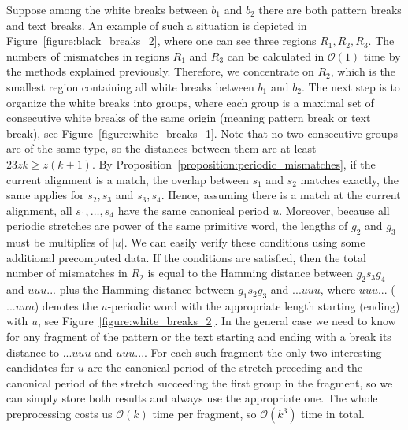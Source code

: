 \documentclass[runningheads]{llncs}
\begin{document}
\begin{mycases}[listparindent=15pt]
\item Suppose among the white breaks between $b_1$ and $b_2$ there are both pattern breaks and text breaks. An example of such a situation is depicted in Figure~\ref{figure:black_breaks_2}, where one can see three regions $R_1,R_2,R_3$.
The numbers of mismatches in regions $R_1$ and $R_3$ can be calculated in $\mathcal{O}(1)$ time by the methods explained previously. Therefore, we concentrate on $R_2$, which is the smallest region containing all white breaks between $b_1$ and $b_2$. The next step is to organize the white breaks into groups, where each group is a maximal set of consecutive white breaks of the same origin (meaning pattern break or text break),
see Figure~\ref{figure:white_breaks_1}.
Note that no two consecutive groups are of the same type, so the distances between them are at least $23zk\geq z(k+1)$. By Proposition~\ref{proposition:periodic_mismatches}, if the current alignment is a match, the overlap between $s_1$ and $s_2$ matches exactly, the same applies for $s_2, s_3$ and $s_3, s_4$. Hence, assuming there is a match at the current alignment, all $s_1, \ldots, s_4$ have the same canonical period $u$. Moreover, because all periodic stretches are power of the same primitive word, the lengths of $g_2$ and $g_3$ must be multiplies of $|u|$.
We can easily verify these conditions using some additional precomputed data. If the conditions are satisfied, then the total number of mismatches in $R_2$ is equal to the Hamming distance between $g_{2}s_{3}g_{4}$ and $uuu...$ plus the Hamming distance between $g_{1}s_{2}g_{3}$ and $...uuu$, where $uuu...$ ($...uuu$) denotes the $u$-periodic word with the appropriate length starting (ending) with $u$, see Figure~\ref{figure:white_breaks_2}. In the general case we need to know for any fragment of the pattern or the text starting and ending with a break its distance to $...uuu$ and $uuu...$. For each such fragment the only two interesting candidates for $u$ are the canonical period of the stretch preceding and the canonical period of the stretch succeeding the first group in the fragment, so we can simply store both results and always use the appropriate one. The whole preprocessing costs us $\mathcal{O}(k)$ time per fragment, so $\mathcal{O}(k^3)$ time in total.


\end{mycases}
\end{document}
